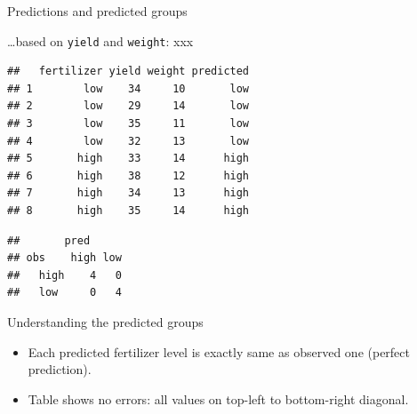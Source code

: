 \documentclass[ignorenonframetext,]{beamer}
\newenvironment{Shaded}{\begin{snugshade}}{\end{snugshade}}
\newcommand{\DataTypeTok}[1]{\textcolor[rgb]{0.13,0.29,0.53}{#1}}
\newcommand{\KeywordTok}[1]{\textcolor[rgb]{0.13,0.29,0.53}{\textbf{#1}}}
\newcommand{\NormalTok}[1]{#1}
\newcommand{\OperatorTok}[1]{\textcolor[rgb]{0.81,0.36,0.00}{\textbf{#1}}}
\begin{document}
\begin{frame}[fragile]{Predictions and predicted groups}
\protect\hypertarget{predictions-and-predicted-groups}{}

\ldots based on \texttt{yield} and \texttt{weight}: xxx

\footnotesize

\begin{Shaded}
\end{Shaded}

\begin{verbatim}
##   fertilizer yield weight predicted
## 1        low    34     10       low
## 2        low    29     14       low
## 3        low    35     11       low
## 4        low    32     13       low
## 5       high    33     14      high
## 6       high    38     12      high
## 7       high    34     13      high
## 8       high    35     14      high
\end{verbatim}

\begin{Shaded}
\end{Shaded}

\begin{verbatim}
##       pred
## obs    high low
##   high    4   0
##   low     0   4
\end{verbatim}

\normalsize

\end{frame}

\begin{frame}{Understanding the predicted groups}
\protect\hypertarget{understanding-the-predicted-groups}{}

\begin{itemize}
\item
  Each predicted fertilizer level is exactly same as observed one
  (perfect prediction).
\item
  Table shows no errors: all values on top-left to bottom-right
  diagonal.
\end{itemize}

\end{frame}
\end{document}
